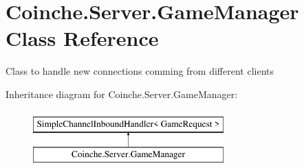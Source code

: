 \hypertarget{class_coinche_1_1_server_1_1_game_manager}{}\section{Coinche.\+Server.\+Game\+Manager Class Reference}
\label{class_coinche_1_1_server_1_1_game_manager}


Class to handle new connections comming from different clients  


Inheritance diagram for Coinche.\+Server.\+Game\+Manager\+:\begin{figure}[H]
\begin{center}
\leavevmode
\includegraphics[height=2.000000cm]{class_coinche_1_1_server_1_1_game_manager}
\end{center}
\end{figure}
